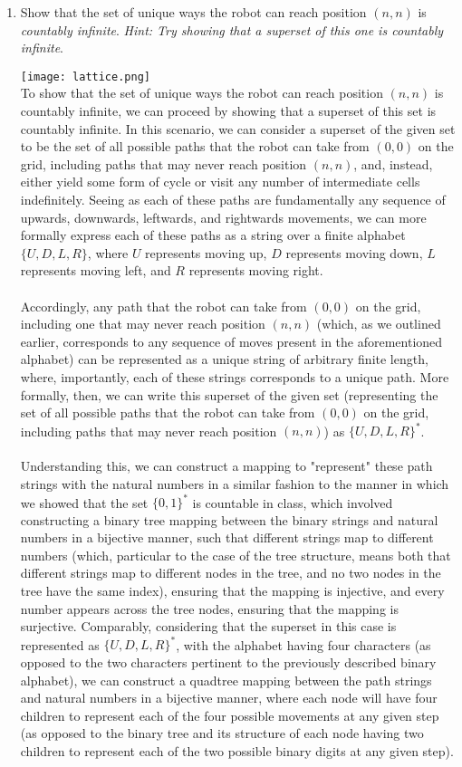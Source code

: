 \documentclass[12pt]{article}
\begin{document}
{\begin{enumerate}
	\item Show that the set of unique ways the robot can reach position $(n,n)$ is \emph{countably infinite}. \emph{Hint: Try showing that a superset of this one is countably infinite}.

\texttt{[image: lattice.png]}\\

To show that the set of unique ways the robot can reach position $(n,n)$ is countably infinite, we can proceed by showing that a superset of this set is countably infinite. In this scenario, we can consider a superset of the given set to be the set of all possible paths that the robot can take from $(0, 0)$ on the grid, including paths that may never reach position $(n,n)$, and, instead, either yield some form of cycle or visit any number of intermediate cells indefinitely. Seeing as each of these paths are fundamentally any sequence of upwards, downwards, leftwards, and rightwards movements, we can more formally express each of these paths as a string over a finite alphabet $\{U, D, L, R\}$, where $U$ represents moving up, $D$ represents moving down, $L$ represents moving left, and $R$ represents moving right.\\
\\
Accordingly, any path that the robot can take from $(0, 0)$ on the grid, including one that may never reach position $(n,n)$ (which, as we outlined earlier, corresponds to any sequence of moves present in the aforementioned alphabet) can be represented as a unique string of arbitrary finite length, where, importantly, each of these strings corresponds to a unique path. More formally, then, we can write this superset of the given set (representing the set of all possible paths that the robot can take from $(0, 0)$ on the grid, including paths that may never reach position $(n,n)$) as $\{U, D, L, R\}^*$.\\
\\
Understanding this, we can construct a mapping to "represent" these path strings with the natural numbers in a similar fashion to the manner in which we showed that the set $\{0, 1\}^*$ is countable in class, which involved constructing a binary tree mapping between the binary strings and natural numbers in a bijective manner, such that different strings map to different numbers (which, particular to the case of the tree structure, means both that different strings map to different nodes in the tree, and no two nodes in the tree have the same index), ensuring that the mapping is injective, and every number appears across the tree nodes, ensuring that the mapping is surjective. Comparably, considering that the superset in this case is represented as $\{U, D, L, R\}^*$, with the alphabet having four characters (as opposed to the two characters pertinent to the previously described binary alphabet), we can construct a quadtree mapping between the path strings and natural numbers in a bijective manner, where each node will have four children to represent each of the four possible movements at any given step (as opposed to the binary tree and its structure of each node having two children to represent each of the two possible binary digits at any given step).\\

\end{enumerate}}
\end{document}
